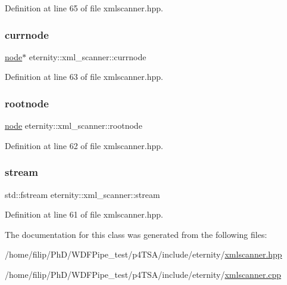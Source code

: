 Definition at line 65 of file xmlscanner.\+hpp.

\mbox{\label{classeternity_1_1xml__scanner_ae40ec446a15f3ed7394d875473be3676}} 
\subsubsection{\texorpdfstring{currnode}{currnode}}
{\footnotesize\ttfamily \hyperlink{classeternity_1_1node}{node}$\ast$ eternity\+::xml\+\_\+scanner\+::currnode\hspace{0.3cm}{\ttfamily [private]}}



Definition at line 63 of file xmlscanner.\+hpp.

\mbox{\label{classeternity_1_1xml__scanner_a5b233a950be70889f4db08d8fa713e66}} 
\subsubsection{\texorpdfstring{rootnode}{rootnode}}
{\footnotesize\ttfamily \hyperlink{classeternity_1_1node}{node} eternity\+::xml\+\_\+scanner\+::rootnode\hspace{0.3cm}{\ttfamily [private]}}



Definition at line 62 of file xmlscanner.\+hpp.

\mbox{\label{classeternity_1_1xml__scanner_aa2c16eaaca14155bfa84a9b3307b3afe}} 
\subsubsection{\texorpdfstring{stream}{stream}}
{\footnotesize\ttfamily std\+::fstream eternity\+::xml\+\_\+scanner\+::stream\hspace{0.3cm}{\ttfamily [private]}}



Definition at line 61 of file xmlscanner.\+hpp.



The documentation for this class was generated from the following files\+:\begin{DoxyCompactItemize}
\item 
/home/filip/\+Ph\+D/\+W\+D\+F\+Pipe\+\_\+test/p4\+T\+S\+A/include/eternity/\hyperlink{xmlscanner_8hpp}{xmlscanner.\+hpp}\item 
/home/filip/\+Ph\+D/\+W\+D\+F\+Pipe\+\_\+test/p4\+T\+S\+A/include/eternity/\hyperlink{xmlscanner_8cpp}{xmlscanner.\+cpp}\end{DoxyCompactItemize}
